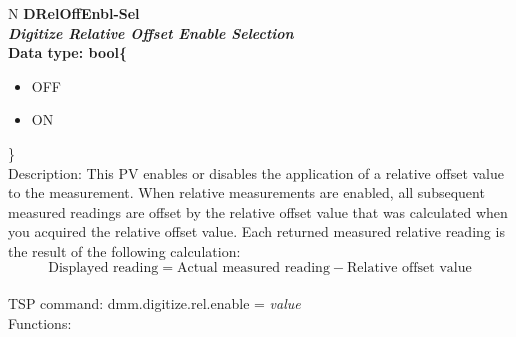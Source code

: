 \documentclass[openany]{article}
\begin{document}
		\begin{tabular}{N}
			\hline
			\bfseries DRelOffEnbl-Sel\label{pv:dreloffenbl-sel} \\ \hline
			\emph{Digitize Relative Offset Enable Selection} \\
			Data type: bool\{\begin{itemize}[noitemsep]
				\small
				\item[] OFF
				\item[] ON
			\end{itemize}\} \\
			Description: This PV enables or disables the application of a relative offset value to the measurement. When relative measurements are enabled, all subsequent measured readings are offset by the relative offset value that was calculated when you acquired the relative offset value. Each returned measured relative reading is the result of the following calculation: $$\text{Displayed reading} = \text{Actual measured reading} - \text{Relative offset value}$$ \\
			TSP command: dmm.digitize.rel.enable = \emph{value} \\
			Functions: \\
			\arrayrulecolor{\FuncTableBorderColor}

		\end{tabular}
\end{document}
